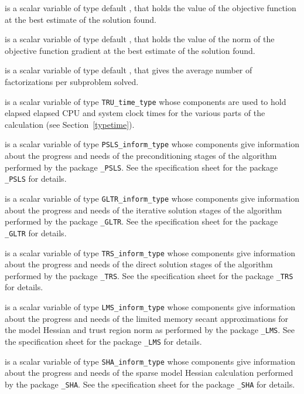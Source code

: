 \documentclass{galahad}
\newcommand{\packagename}{TRU}
\begin{document}
\begin{description}
 is a scalar variable of type default \realdp, that holds the
value of the objective function at the best estimate of the solution found.

 is a scalar variable of type default \realdp, that holds the
value of the norm of the objective function gradient at the best estimate
of the solution found.

 is a scalar variable of type default \realdp, that
gives the average number of factorizations per subproblem solved.

 is a scalar variable of type {\tt \packagename\_time\_type}
whose components are used to hold elapsed elapsed CPU and system clock
times for the various parts of the calculation (see Section~\ref{typetime}).


 is a scalar variable of type
{\tt PSLS\_inform\_type}
whose components give information about the progress and needs
of the preconditioning stages of the algorithm performed by the package
{\tt \libraryname\_PSLS}.
See the specification sheet for the package
{\tt \libraryname\_PSLS}
for details.

 is a scalar variable of type
{\tt GLTR\_inform\_type}
whose components give information about the progress and needs
of the iterative solution stages of the algorithm performed by the package
{\tt \libraryname\_GLTR}.
See the specification sheet for the package
{\tt \libraryname\_GLTR}
for details.

 is a scalar variable of type
{\tt TRS\_inform\_type}
whose components give information about the progress and needs
of the direct solution stages of the algorithm performed by the package
{\tt \libraryname\_TRS}.
See the specification sheet for the package
{\tt \libraryname\_TRS}
for details.

 is a scalar variable of type
{\tt LMS\_inform\_type}
whose components give information about the progress and needs
of the limited memory secant approximations for the model Hessian
and trust region norm as performed by the package
{\tt \libraryname\_LMS}.
See the specification sheet for the package
{\tt \libraryname\_LMS}
for details.

 is a scalar variable of type
{\tt SHA\_inform\_type}
whose components give information about the progress and needs
of the sparse model Hessian calculation performed by the package
{\tt \libraryname\_SHA}.
See the specification sheet for the package
{\tt \libraryname\_SHA}
for details.

\end{description}
\end{document}
